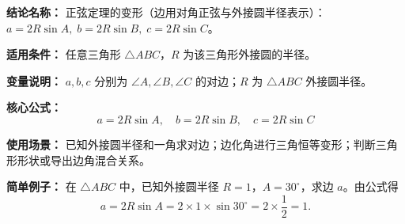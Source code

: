 \textbf{结论名称：} 正弦定理的变形（边用对角正弦与外接圆半径表示）：\( a=2R\sin A,\; b=2R\sin B,\; c=2R\sin C \)。

\textbf{适用条件：} 任意三角形 \(\triangle ABC\)，\(R\) 为该三角形外接圆的半径。

\textbf{变量说明：} \(a,b,c\) 分别为 \(\angle A,\angle B,\angle C\) 的对边；\(R\) 为 \(\triangle ABC\) 外接圆半径。

\textbf{核心公式：}
\[
\boxed{a=2R\sin A,\quad b=2R\sin B,\quad c=2R\sin C}
\]

\textbf{使用场景：} 已知外接圆半径和一角求对边；边化角进行三角恒等变形；判断三角形形状或导出边角混合关系。

\textbf{简单例子：} 在 \(\triangle ABC\) 中，已知外接圆半径 \(R=1\)，\(A=30^\circ\)，求边 \(a\)。由公式得
\[
a = 2R\sin A = 2\times 1\times \sin 30^\circ = 2\times \frac12 = 1.
\]